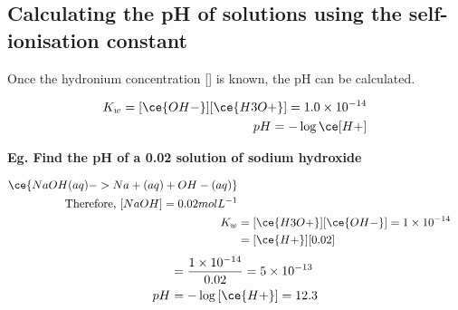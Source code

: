 	\subsection{Calculating the pH of solutions using the self-ionisation constant}
		
		Once the hydronium concentration [] is known, the pH can be calculated.

		\begin{align*}
			K_w = [\ce{OH-}][\ce{H3O+}] = 1.0 \times 10^{-14} \\
			pH = - \log{\ce[H+]}
		\end{align*}

		\textbf{Eg. Find the pH of a 0.02 \si{\molar} solution of sodium hydroxide}

			\begin{align*}
				\ce{NaOH(aq) -> Na+(aq) + OH-(aq)} \\
				\text{Therefore, }[NaOH] = 0.02 mol L^{-1} \\
				K_w &= [\ce{H3O+}][\ce{OH-}] = 1 \times 10^{-14} \\
				    &= [\ce{H+}][0.02]
			\end{align*}
			\begin{align*}
				[\ce{H+}] &= \frac{1 \times 10^{-14}}{0.02} = 5 \times 10^{-13} \\
				pH &= - \log{[\ce{H+}]} = 12.3
			\end{align*}



